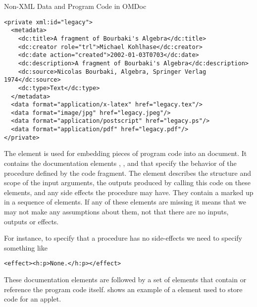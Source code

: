 \begin{module}[id=ext]
\begin{omgroup}[id=ext,short=Auxiliary Elements]
\begin{omgroup}[id=private]{Non-XML Data and Program Code in OMDoc}
\begin{lstlisting}[label=lst:private-fig,index={private,data},
  caption={A \element{private} Element for an Image}]
<private xml:id="legacy">
  <metadata>
    <dc:title>A fragment of Bourbaki's Algebra</dc:title>
    <dc:creator role="trl">Michael Kohlhase</dc:creator> 
    <dc:date action="created">2002-01-03T0703</dc:date>
    <dc:description>A fragment of Bourbaki's Algebra</dc:description>
    <dc:source>Nicolas Bourbaki, Algebra, Springer Verlag 1974</dc:source>
    <dc:type>Text</dc:type>
  </metadata>
  <data format="application/x-latex" href="legacy.tex"/>
  <data format="image/jpg" href="legacy.jpeg"/>
  <data format="application/postscript" href="legacy.ps"/>
  <data format="application/pdf" href="legacy.pdf"/>
</private>
\end{lstlisting}

\begin{definition}[id=xputeffect.def]
  The  element is used for embedding pieces of program code into an
  \omdoc document.  It contains the documentation elements {},
  {}, and {} that specify the behavior of the procedure
  defined by the code fragment.  The  element describes the structure and
  scope of the input arguments,  the outputs produced by calling this
  code on these elements, and  any side effects the procedure may have.
  They contain a {} marked up in a sequence of
   elements. If any of these elements are missing it means that we may not make any
  assumptions about them, not that there are no inputs, outputs or effects.
\end{definition}
For instance, to specify that a procedure has no side-effects we need to specify something
like
\begin{lstlisting}
<effect><h:p>None.</h:p></effect>
\end{lstlisting}

These documentation elements are followed by a set of  elements
that contain or reference the program code itself. {} shows an
example of a  element used to store {} code for an
applet.


\end{omgroup}
\end{omgroup}
\end{module}

